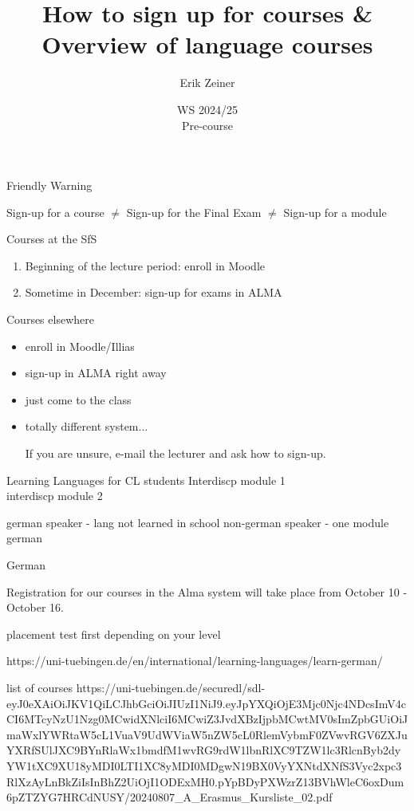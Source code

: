\documentclass[aspectratio=169,hyperref={unicode}]{beamer}
\title{How to sign up for courses \& Overview of language courses}
\author{Erik Zeiner}
\institute{Fachschaft General \& Computational Linguistics\\ \textbf{University of Tübingen}}
\date{WS 2024/25 \\ Pre-course}
\begin{document}
\frame{\titlepage}

\begin{frame}{Friendly Warning}

Sign-up for a course $\neq$ Sign-up for the Final Exam $\neq$ Sign-up for a module
\end{frame}


\begin{frame}{Courses at the SfS}
\begin{enumerate}
	\item Beginning of the lecture period: enroll in Moodle
	\item Sometime in December: sign-up for exams in ALMA  
\end{enumerate}
\end{frame}

\begin{frame}{Courses elsewhere}


\begin{itemize}
	\item enroll in Moodle/Illias
	\item sign-up in ALMA right away
	\item just come to the class
	\item totally different system...

\vfill

\begin{center}
	If you are unsure, e-mail the lecturer and ask how to sign-up.
\end{center}
\end{itemize}

\end{frame}

\begin{frame}{Learning Languages for CL students}
	Interdiscp module 1\\
	interdiscp module 2
	
	
	german speaker - lang not learned in school
	non-german speaker - one module german
	
\end{frame}


\begin{frame}{German}


Registration for our courses in the Alma system will take place from October 10 - October 16. 

 placement test first depending on your level
 
 
 https://uni-tuebingen.de/en/international/learning-languages/learn-german/
 
 
 list of courses https://uni-tuebingen.de/securedl/sdl-eyJ0eXAiOiJKV1QiLCJhbGciOiJIUzI1NiJ9.eyJpYXQiOjE3Mjc0Njc4NDcsImV4cCI6MTcyNzU1Nzg0MCwidXNlciI6MCwiZ3JvdXBzIjpbMCwtMV0sImZpbGUiOiJmaWxlYWRtaW5cL1VuaV9UdWViaW5nZW5cL0RlemVybmF0ZVwvRGV6ZXJuYXRfSUlJXC9BYnRlaWx1bmdfM1wvRG9rdW1lbnRlXC9TZW1lc3RlcnByb2dyYW1tXC9XU18yMDI0LTI1XC8yMDI0MDgwN19BX0VyYXNtdXNfS3Vyc2xpc3RlXzAyLnBkZiIsInBhZ2UiOjI1ODExMH0.pYpBDyPXWzrZ13BVhWleC6oxDum6pZTZYG7HRCdNUSY/20240807_A_Erasmus_Kursliste_02.pdf
 
\end{frame}
\end{document}

